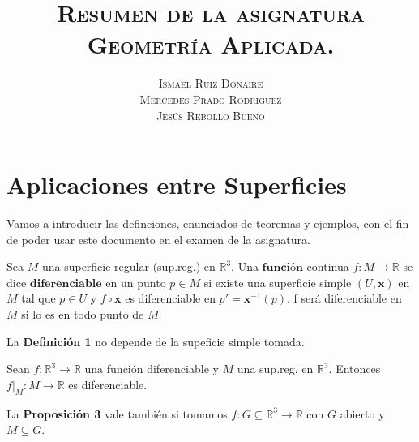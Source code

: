 \documentclass[twoside]{report}
\title{\textsc{Resumen de la asignatura\\ Geometría Aplicada.}}
\author{\textsc{Ismael Ruiz Donaire}\\ \textsc{Mercedes Prado Rodríguez}\\ \textsc{Jesús Rebollo Bueno}}
\date{}
\begin{document}
\maketitle{}




\chapter{Aplicaciones entre Superficies}

Vamos a introducir las definciones, enunciados de teoremas y ejemplos, con el fin de poder usar este documento en el examen de la asignatura.

\begin{defi}
Sea $M$ una superficie regular (sup.reg.) en $\mathbb{R}^3$. Una $\textbf{función}$ continua $f: M \rightarrow \mathbb{R}$ se dice $\textbf{diferenciable}$ en un punto $p \in M$ si existe una superficie simple $(U,\textbf{x})$ en $M$ tal que  $p \in U$ y $ f\circ \textbf{x}$ es diferenciable en $p' = \textbf{x}^{-1}(p)$. f será diferenciable en $M$ si lo es en todo punto de $M$.
\end{defi}

\begin{prop}
La \textup{\textbf{Definición 1}} no depende de la supeficie simple tomada.
\end{prop}

\begin{prop}
Sean $f: \mathbb{R}^3 \rightarrow \mathbb{R}$ una función diferenciable y $M$ una sup.reg. en $\mathbb{R}^3$. Entonces $f\vert_M : M \rightarrow \mathbb{R}$ es diferenciable.
\end{prop}

\begin{nota}
La \textbf{Proposición 3} vale también si tomamos $f: G \subseteq \mathbb{R}^3 \rightarrow \mathbb{R}$ con $G$ abierto y $M\subseteq G$.
\end{nota}
\end{document}
